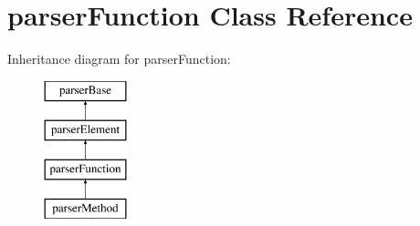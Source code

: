 \hypertarget{classparser_function}{\section{parser\-Function \-Class \-Reference}
\label{classparser_function}
}
\-Inheritance diagram for parser\-Function\-:\begin{figure}[H]
\begin{center}
\leavevmode
\includegraphics[height=4.000000cm]{classparser_function}
\end{center}
\end{figure}
